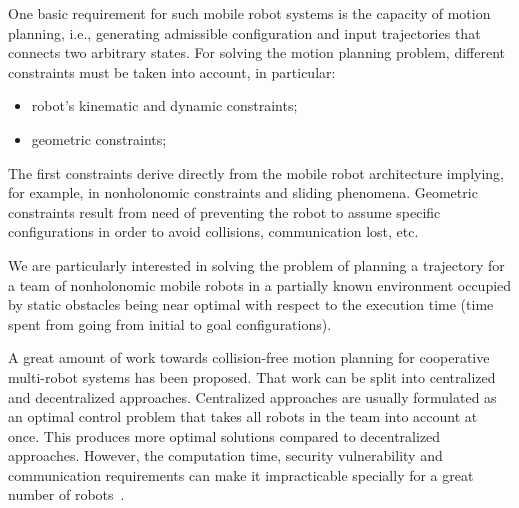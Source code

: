 \documentclass[eprint]{actapoly}
\begin{document}

One basic requirement for such mobile robot systems is the capacity of motion planning, i.e., generating admissible configuration and input trajectories that connects two arbitrary states. For solving the motion planning problem, different 
constraints must be taken into account, in particular:

\begin{itemize}

 \item robot's kinematic and dynamic constraints;

 \item geometric constraints;


\end{itemize}

The first constraints derive directly from the mobile robot architecture 
implying, for example, in nonholonomic constraints and sliding phenomena.
Geometric 
constraints result from need of preventing the robot to assume specific configurations
in order to avoid collisions, communication lost, etc.


We are particularly interested in solving the problem of planning a 
trajectory for a team of nonholonomic mobile robots in a partially known 
environment occupied by static obstacles being near optimal with respect to the 
execution time (time spent from going from initial to goal configurations).



A great amount of work towards collision-free motion 
planning for cooperative multi-robot systems has been proposed. That work can
be split into centralized and decentralized approaches.
Centralized approaches are usually formulated as an optimal
control problem that takes all robots in the team into account at once.
This produces more optimal solutions compared to decentralized approaches. However, the computation time, security vulnerability and communication 
requirements can make it impracticable specially for a great number of 
robots~\cite{Borrelli2006}.
\end{document}
